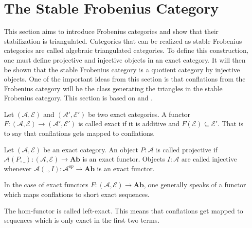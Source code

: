 \section{The Stable Frobenius Category}

    This section aims to introduce Frobenius categories and show that their stabilization is triangulated. Categories that can be realized as stable Frobenius categories are called algebraic triangulated categories. To define this construction, one must define projective and injective objects in an exact category. It will then be shown that the stable Frobenius category is a quotient category by injective objects. One of the important ideas from this section is that conflations from the Frobenius category will be the class generating the triangles in the stable Frobenius category. This section is based on \cite{buhler} and \cite{happel}.

    \begin{definition}
        Let $(\mathcal{A},\mathcal{E})$ and $(\mathcal{A}',\mathcal{E}')$ be two exact categories. A functor $F:(\mathcal{A},\mathcal{E})\rightarrow (\mathcal{A}',\mathcal{E}')$ is called exact if it is additive and $F(\mathcal{E})\subseteq \mathcal{E}'$. That is to say that conflations gets mapped to conflations. %
    \end{definition}

    \begin{definition}
        Let $(\mathcal{A},\mathcal{E})$ be an exact category. An object $P:\mathcal{A}$ is called projective if $\mathcal{A}(P,\_):(\mathcal{A},\mathcal{E})\rightarrow \textbf{Ab}$ is an exact functor. Objects $I:\mathcal{A}$ are called injective whenever $\mathcal{A}(\_,I):\mathcal{A}^{op}\rightarrow\textbf{Ab}$ is an exact functor.
    \end{definition}

    \begin{remark}
        In the case of exact functors $F:(\mathcal{A},\mathcal{E})\rightarrow\textbf{Ab}$, one generally speaks of a functor which maps conflations to short exact sequences.
    \end{remark}

    \begin{remark}
        The hom-functor is called left-exact. This means that conflations get mapped to sequences which is only exact in the first two terms.
    \end{remark}

